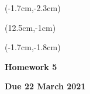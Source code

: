 \documentclass[12pt, oneside]{article}
\begin{document}
\begin{textblock*}{4cm}(-1.7cm,-2.3cm)
\end{textblock*}

\begin{textblock*}{8cm}(12.5cm,-1cm)
\end{textblock*}
\begin{textblock*}{13.5cm}(-1.7cm,-1.8cm)
\end{textblock*}

\vspace{1cm}

\begin{center}
\textbf{\Large Homework 5}

\textbf{Due 22 March 2021}
\end{center}
\end{document}
